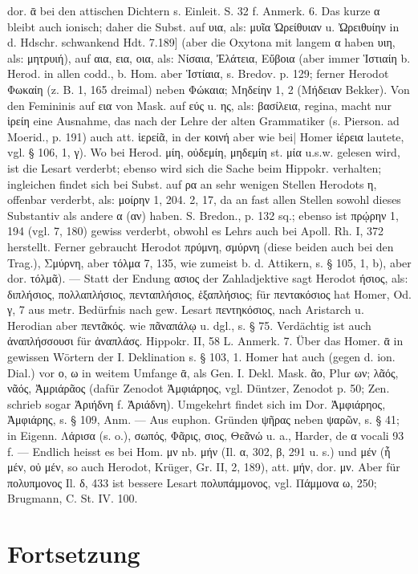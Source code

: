 dor. ᾱ bei den attischen Dichtern s. Einleit. S. 32 f. Anmerk. 6. Das kurze α bleibt auch ionisch; daher die Subst. auf υια, als: μυῖα Ὠρείθυιαν u. Ὠρειθυίην in d. Hdschr. schwankend Hdt. 7.189] (aber die Oxytona mit langem α haben υιη, als: μητρυιή), auf αια, εια, οια, als: Νίσαια, Ἐλάτεια, Εὔβοια (aber immer Ἱστιαίη b. Herod. in allen codd., b. Hom. aber Ἱστίαια, s. Bredov. p. 129; ferner Herodot Φωκαίη (z. B. 1, 165 dreimal) neben Φώκαια; Μηδείην 1, 2 (Μήδειαν Bekker). Von den Femininis auf εια von Mask. auf εύς u. ης, als: βασίλεια, regina, macht nur ἱρείη eine Ausnahme, das nach der Lehre der alten Grammatiker (s. Pierson. ad Moerid., p. 191) auch att. ἱερείᾶ, in der κοινή aber wie bei| Homer ἱέρεια lautete, vgl. § 106, 1, γ). Wo bei Herod. μίη, οὐδεμίη, μηδεμίη st. μία u.s.w. gelesen wird, ist die Lesart verderbt; ebenso wird sich die Sache beim Hippokr. verhalten; ingleichen findet sich bei Subst. auf ρα an sehr wenigen Stellen Herodots η, offenbar verderbt, als: μοίρην 1, 204. 2, 17, da an fast allen Stellen sowohl dieses Substantiv als andere α (αν) haben. S. Bredon., p. 132 sq.; ebenso ist πρῴρην 1, 194 (vgl. 7, 180) gewiss verderbt, obwohl es Lehrs auch bei Apoll. Rh. I, 372 herstellt. Ferner gebraucht Herodot πρύμνη, σμύρνη (diese beiden auch bei den Trag.), Σμύρνη, aber τόλμα 7, 135, wie zumeist b. d. Attikern, s. § 105, 1, b), aber dor. τόλμᾶ). — Statt der Endung ασιος der Zahladjektive sagt Herodot ήσιος, als: διπλήσιος, πολλαπλήσιος, πενταπλήσιος, ἑξαπλήσιος; für πεντακόσιος hat Homer, Od. γ, 7 aus metr. Bedürfnis nach gew. Lesart πεντηκόσιος, nach Aristarch u. Herodian aber πεντᾶκός. wie πᾶναπάλῳ u. dgl., s. § 75. Verdächtig ist auch ἀναπλήσσουσι für ἀναπλάσς. Hippokr. II, 58 L. Anmerk. 7. Über das Homer. ᾱ in gewissen Wörtern der I. Deklination s. § 103, 1. Homer hat auch (gegen d. ion. Dial.) vor ο, ω in weitem Umfange ᾱ, als Gen. I. Dekl. Mask. ᾶο, Plur ων; λᾶός, νᾶός, Ἀμριάρᾶος (dafür Zenodot Ἀμφιάρηος, vgl. Düntzer, Zenodot p. 50; Zen. schrieb sogar Ἀριήδνη f. Ἀριάδνη). Umgekehrt findet sich im Dor. Ἀμφιάρηος, Ἀμφιάρης, s. § 109, Anm. — Aus euphon. Gründen ψῆρας neben ψαρῶν, s. § 41; in Eigenn. Λάρισα (s. o.), σωπός, Φᾶρις, σιος, Θεᾶνώ u. a., Harder, de α vocali 93 f. — Endlich heisst es bei Hom. μν nb. μήν (Il. α, 302, β, 291 u. s.) und μέν (ἦ μέν, οὐ μέν, so auch Herodot, Krüger, Gr. II, 2, 189), att. μήν, dor. μν. Aber für πολυπμονος Il. δ, 433 ist bessere Lesart πολυπάμμονος, vgl. Πάμμονα ω, 250; Brugmann, C. St. IV. 100.
\section{Fortsetzung}

